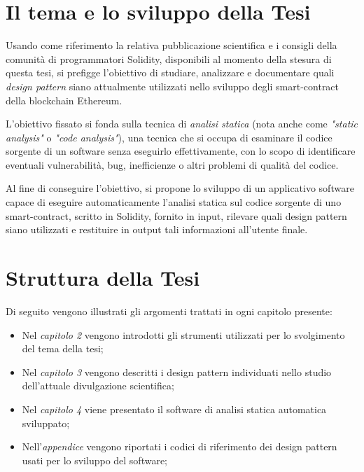 \section{Il tema e lo sviluppo della Tesi}
Usando come riferimento la relativa pubblicazione scientifica e i consigli della comunità di programmatori Solidity, disponibili al momento della stesura di questa tesi, si prefigge l'obiettivo di studiare, analizzare e documentare quali \textit{design pattern} siano attualmente utilizzati nello sviluppo degli smart-contract della blockchain Ethereum.

L'obiettivo fissato si fonda sulla tecnica di \textit{analisi statica} (nota anche come \textit{"static analysis"} o \textit{"code analysis"}), una tecnica che si occupa di esaminare il codice sorgente di un software senza eseguirlo effettivamente, con lo scopo di identificare eventuali vulnerabilità, bug, inefficienze o altri problemi di qualità del codice. 

Al fine di conseguire l'obiettivo, si propone lo sviluppo di un applicativo software capace di eseguire automaticamente l'analisi statica sul codice sorgente di uno smart-contract, scritto in Solidity, fornito in input, rilevare quali design pattern siano utilizzati e restituire in output tali informazioni all'utente finale. 


\section{Struttura della Tesi}
Di seguito vengono illustrati gli argomenti trattati in ogni capitolo presente:
\begin{itemize}
	\item Nel \textit{capitolo 2} vengono introdotti gli strumenti utilizzati per lo svolgimento del tema della tesi;
	\item Nel \textit{capitolo 3} vengono descritti i design pattern individuati nello studio dell'attuale divulgazione scientifica;
	\item Nel \textit{capitolo 4} viene presentato il software di analisi statica automatica sviluppato;
	\item Nell'\textit{appendice} vengono riportati i codici di riferimento dei design pattern usati per lo sviluppo del software;
\end{itemize}